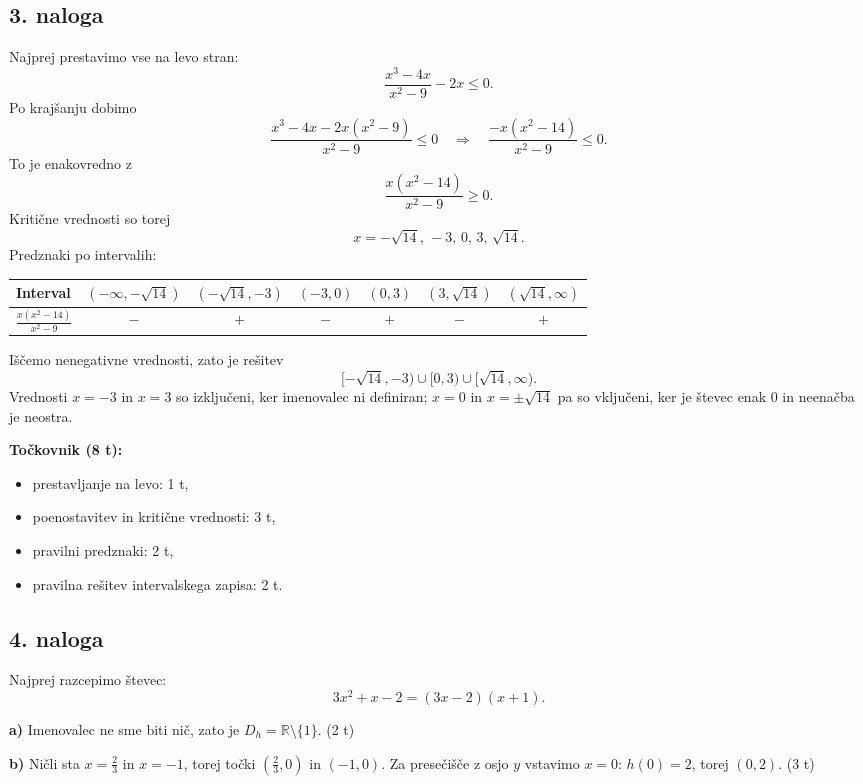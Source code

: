 \documentclass[11pt]{article}
\begin{document}
\subsection*{3. naloga}
\vspace{0.2em}

Najprej prestavimo vse na levo stran:
\[
 \frac{x^3-4x}{x^2-9}-2x\le 0.
\]
Po krajšanju dobimo
\[
 \frac{x^3-4x-2x(x^2-9)}{x^2-9}\le 0
\quad\Longrightarrow\quad
 \frac{-x(x^2-14)}{x^2-9}\le 0.
\]
To je enakovredno z
\[
 \frac{x(x^2-14)}{x^2-9}\ge 0.
\]
Kritične vrednosti so torej
\[
 x=-\sqrt{14},\,-3,\,0,\,3,\,\sqrt{14}.
\]
Predznaki po intervalih:

\begin{tabular}{|l|c|c|c|c|c|c|}
\hline
Interval & $(-\infty,-\sqrt{14})$ & $(-\sqrt{14},-3)$ & $(-3,0)$ & $(0,3)$ & $(3,\sqrt{14})$ & $(\sqrt{14},\infty)$ \\
\hline
$\frac{x(x^2-14)}{x^2-9}$ & $-$ & $+$ & $-$ & $+$ & $-$ & $+$ \\
\hline
\end{tabular}

Iščemo nenegativne vrednosti, zato je rešitev
\[
 \boxed{[-\sqrt{14},-3)\cup[0,3)\cup[\sqrt{14},\infty)}.
\]
Vrednosti $x=-3$ in $x=3$ so izključeni, ker imenovalec ni definiran; $x=0$ in $x=\pm\sqrt{14}$ pa so vključeni, ker je števec enak 0 in neenačba je neostra.

\textbf{Točkovnik (8 t):}
\vspace{0.35em}
\begin{itemize}[leftmargin=2.5em]
  \item prestavljanje na levo: 1 t,
  \item poenostavitev in kritične vrednosti: 3 t,
  \item pravilni predznaki: 2 t,
  \item pravilna rešitev intervalskega zapisa: 2 t.
\end{itemize}

\newpage

\subsection*{4. naloga}
\vspace{0.2em}

Najprej razcepimo števec:
\[
 3x^2+x-2=(3x-2)(x+1).
\]

\textbf{a)} Imenovalec ne sme biti nič, zato je $D_h=\mathbb{R}\setminus\{1\}$. (2 t)

\textbf{b)} Ničli sta $x=\frac{2}{3}$ in $x=-1$, torej točki $\left(\frac{2}{3},0\right)$ in $(-1,0)$. Za presečišče z osjo $y$ vstavimo $x=0$: $h(0)=2$, torej $(0,2)$. (3 t)
\end{document}
